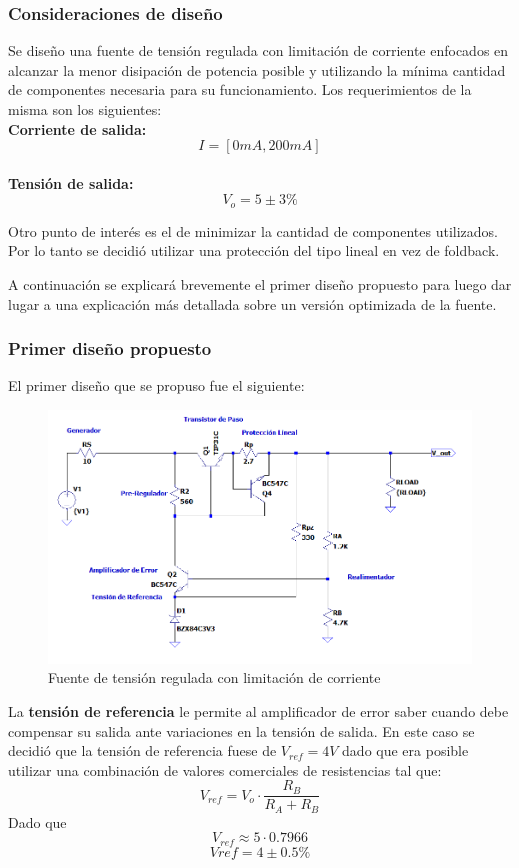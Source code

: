 


	
\subsubsection{Consideraciones de diseño}
Se diseño una fuente de tensión regulada con limitación de corriente enfocados en alcanzar la menor disipación de potencia posible y utilizando la mínima cantidad de componentes necesaria para su funcionamiento.
Los requerimientos de la misma son los siguientes:
\\ 
\textbf{Corriente de salida:}
\begin{equation}
	I = [0mA, 200mA]
\end{equation}
\\
\textbf{Tensión de salida:}
\begin{equation}
V_{o} = 5 \pm 3\%
\end{equation}

Otro punto de interés es el de minimizar la cantidad de componentes utilizados. Por lo tanto se decidió utilizar una protección del tipo lineal en vez de foldback.

A continuación se explicará brevemente el primer diseño propuesto para luego dar lugar a una explicación más detallada sobre un versión optimizada de la fuente.

\subsubsection{Primer diseño propuesto}
El primer diseño que se propuso fue el siguiente:
\begin{figure}[H]
	\centering
	\includegraphics[width=0.7\linewidth]{ImagenesEjercicio1/ImagenCircuitoFV}
	\caption{Fuente de tensión regulada con limitación de corriente}
	\label{fig:imagencircuito}
\end{figure}

La \textbf{tensión de referencia} le permite al amplificador de error saber cuando debe compensar su salida ante variaciones en la tensión de salida. 
En este caso se decidió que la tensión de referencia fuese de $V_{ref} = 4V$ dado que era posible utilizar una combinación de valores comerciales de resistencias tal que:
\begin{equation}
	V_{ref}  = V_{o} \cdot \frac{R_B}{R_A + R_B}
\end{equation} 
Dado que 
\begin{equation}
	V_{ref} \approx 5 \cdot 0.7966
\end{equation}
\begin{equation}
	V{ref} = 4 \pm 0.5 \%
\end{equation}

